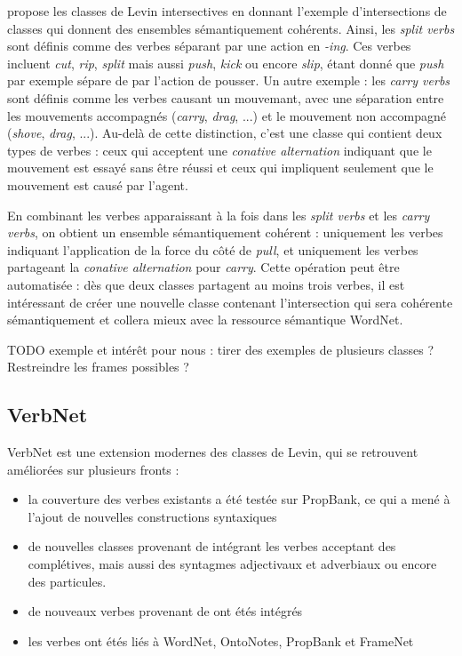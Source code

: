 \cite{dang1998investigating} propose les classes de Levin intersectives en
donnant l'exemple d'intersections de classes qui donnent des ensembles
sémantiquement cohérents. Ainsi, les \textit{split verbs} sont définis comme
des verbes séparant par une action en \textit{-ing}. Ces verbes incluent
\textit{cut}, \textit{rip}, \textit{split} mais aussi \textit{push},
\textit{kick} ou encore \textit{slip}, étant donné que \textit{push} par
exemple sépare de par l'action de pousser. Un autre exemple : les \textit{carry
verbs} sont définis comme les verbes causant un mouvemant, avec une séparation
entre les mouvements accompagnés (\textit{carry}, \textit{drag}, ...) et le
mouvement non accompagné (\textit{shove}, \textit{drag}, ...). Au-delà de cette
distinction, c'est une classe qui contient deux types de verbes : ceux qui
acceptent une \textit{conative alternation} indiquant que le mouvement est
essayé sans être réussi et ceux qui impliquent seulement que le mouvement est
causé par l'agent.

En combinant les verbes apparaissant à la fois dans les \textit{split verbs} et
les \textit{carry verbs}, on obtient un ensemble sémantiquement cohérent :
uniquement les verbes indiquant l'application de la force du côté de
\textit{pull}, et uniquement les verbes partageant la \textit{conative
alternation} pour \textit{carry}. Cette opération peut être automatisée : dès
que deux classes partagent au moins trois verbes, il est intéressant de créer
une nouvelle classe contenant l'intersection qui sera cohérente sémantiquement
et collera mieux avec la ressource sémantique WordNet.


TODO exemple et intérêt pour nous : tirer des exemples de plusieurs classes ?
Restreindre les frames possibles ?

\subsection{VerbNet}

VerbNet est une extension modernes des classes de Levin, qui se retrouvent
améliorées sur plusieurs fronts :

\begin{itemize}

    \item la couverture des verbes existants a été testée sur PropBank, ce qui
        a mené à l'ajout de nouvelles constructions syntaxiques

    \item de nouvelles classes provenant de \cite{korhonen2004extended}
        intégrant les verbes acceptant des complétives, mais aussi des
        syntagmes adjectivaux et adverbiaux ou encore des particules.

    \item de nouveaux verbes provenant de \cite{dorr2001lcs} ont étés intégrés

    \item les verbes ont étés liés à WordNet, OntoNotes, PropBank et FrameNet
        \citep{palmer2009semlink}

\end{itemize}

